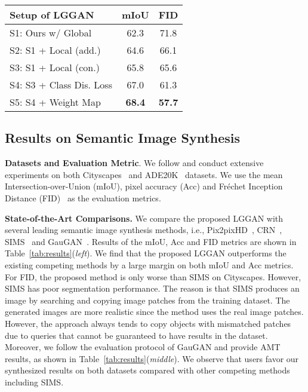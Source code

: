 \documentclass[10pt,twocolumn,letterpaper]{article}
\begin{document}
\begin{table*}[!t]
{\begin{tabular}{lcc}
			Setup of LGGAN &  mIoU  & FID   \\ \midrule	
			S1: Ours w/ Global                                         &  62.3   & 71.8  \\
			S2: S1 + Local (add.)         &  64.6    & 66.1   \\	
			S3: S1 + Local (con.)    &  65.8     & 65.6  \\ 
			S4: S3 + Class Dis. Loss &  67.0 & 61.3  \\
			S5: S4 + Weight Map &  \textbf{68.4} & \textbf{57.7} \\ \bottomrule
		\end{tabular}}
	\label{tab:results}
	\vspace{-0.4cm}
\end{table*}

\subsection{Results on Semantic Image Synthesis}
\noindent \textbf{Datasets and Evaluation Metric}. 
We follow \cite{park2019semantic} and conduct extensive experiments on both Cityscapes~\cite{cordts2016cityscapes} and ADE20K~\cite{zhou2017scene} datasets.
We use the mean Intersection-over-Union (mIoU), pixel accuracy (Acc) and Fr\'echet Inception Distance (FID)~\cite{heusel2017gans} as the evaluation metrics.

\noindent \textbf{State-of-the-Art Comparisons.}
We compare the proposed LGGAN with several leading semantic image synthesis methods, i.e., Pix2pixHD~\cite{wang2018high}, CRN~\cite{chen2017photographic}, SIMS~\cite{qi2018semi} and GauGAN~\cite{park2019semantic}.
Results of the mIoU, Acc and FID metrics are shown in Table~\ref{tab:results}(\textit{left}).
We find that the proposed LGGAN outperforms the existing competing methods by a large margin on both mIoU and Acc metrics.
For FID, the proposed method is only worse than SIMS on Cityscapes.
However, SIMS has poor segmentation performance.
The reason is that SIMS produces an image by searching and copying image patches from the training dataset. 
The generated images are more realistic since the method uses the real image patches.
However, the approach always tends to copy objects with mismatched patches due to queries that cannot be guaranteed to have results in the dataset.
Moreover, we follow the evaluation protocol of GauGAN and provide AMT results, as shown in Table~\ref{tab:results}(\textit{middle}).
We observe that users favor our synthesized results on both datasets compared with other competing methods including SIMS.
\end{document}
